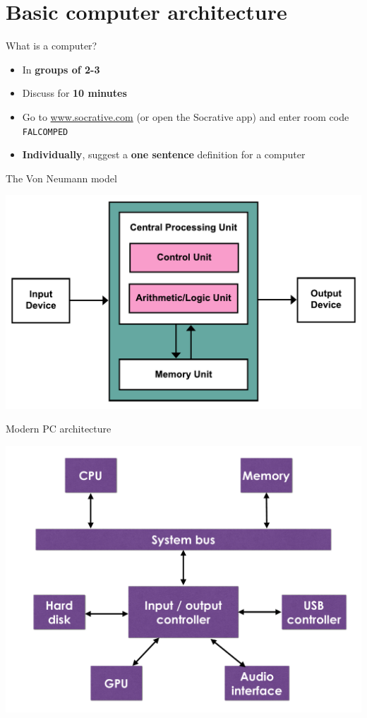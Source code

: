 \part{Basic computer architecture}
\frame{\partpage}

\begin{frame}{What is a computer?}
	\begin{itemize}
		\item In \textbf{groups of 2-3}
		\item Discuss for \textbf{10 minutes}
		\item Go to \url{www.socrative.com} (or open the Socrative app) and enter room code \texttt{FALCOMPED}
		\item \textbf{Individually}, suggest a \textbf{one sentence} definition for a computer
	\end{itemize}
\end{frame}

\begin{frame}{The Von Neumann model}
	\begin{center}
		\includegraphics[height=0.7\textheight]{vonneumann}
	\end{center}
\end{frame}

\begin{frame}{Modern PC architecture}
	\begin{center}
		\includegraphics[height=0.7\textheight]{architecture-diagram}
	\end{center}
\end{frame}

